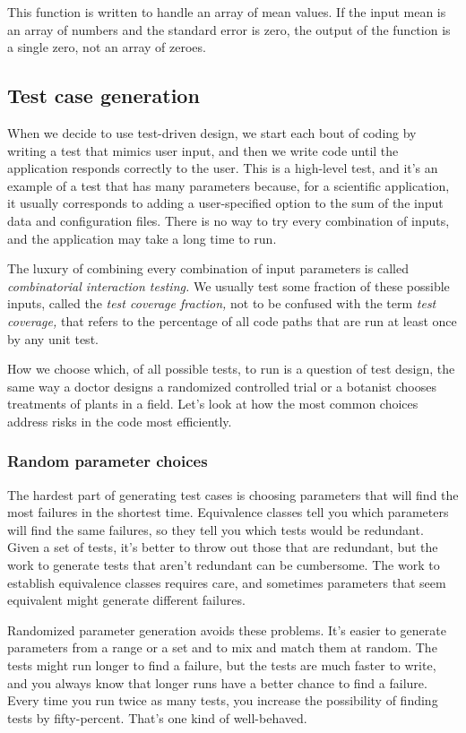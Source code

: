 \documentclass[fleqn,10pt]{olplainarticle}
\begin{document}
This function is written to handle an array of mean values.
If the input mean is an array of numbers and the standard error
is zero, the output of the function is a single zero, not an array
of zeroes.


\subsection{Test case generation}
When we decide to use test-driven design, we start each bout of
coding by writing a test that mimics user input, and then we write
code until the application responds correctly to the user.
This is a high-level test, and it's an example of a test that
has many parameters because, for a scientific application, it
usually corresponds to adding a user-specified option to the
sum of the input data and configuration files. There is no
way to try every combination of inputs, and the application
may take a long time to run.

The luxury of combining every combination of input parameters
is called \emph{combinatorial interaction testing.} We usually
test some fraction of these possible inputs, called the
\emph{test coverage fraction,} not to be confused with the
term \emph{test coverage,} that refers to the percentage of
all code paths that are run at least once by any unit test.

How we choose which, of all possible tests, to run is a question
of test design, the same way a doctor designs a randomized
controlled trial or a botanist chooses treatments of plants
in a field. Let's look at how the most common choices
address risks in the code most efficiently.


\subsubsection{Random parameter choices}

The hardest part of generating test cases is choosing parameters
that will find the most failures in the shortest time. Equivalence
classes tell you which parameters will find the same failures,
so they tell you which tests would be redundant. Given a set
of tests, it's better to throw out those that are redundant,
but the work to generate tests that aren't redundant can be cumbersome.
The work to establish equivalence classes requires care,
and sometimes parameters that seem equivalent might generate
different failures.

Randomized parameter generation avoids these problems. It's easier
to generate parameters from a range or a set and to mix and match
them at random. The tests might run longer to find a failure, but
the tests are much faster to write, and you always know that longer
runs have a better chance to find a failure. Every time you
run twice as many tests, you increase the possibility of finding
tests by fifty-percent. That's one kind of well-behaved.
\end{document}
